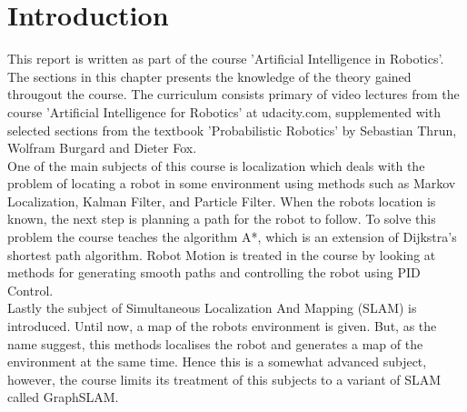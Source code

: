 
\section{Introduction} %
\label{sec:theory_introduction}

This report is written as part of the course 'Artificial Intelligence in Robotics'. The sections in this chapter presents the knowledge of the theory gained througout the course. The curriculum consists primary of video lectures from the course 'Artificial Intelligence for Robotics' at udacity.com, supplemented with selected sections from the textbook 'Probabilistic Robotics' by Sebastian Thrun, Wolfram Burgard and Dieter Fox.\\

One of the main subjects of this course is localization which deals with the problem of locating a robot in some environment using methods such as Markov Localization, Kalman Filter, and Particle Filter. When the robots location is known, the next step is planning a path for the robot to follow. To solve this problem the course teaches the algorithm A*, which is an extension of Dijkstra's shortest path algorithm. Robot Motion is treated in the course by looking at methods for generating smooth paths and controlling the robot using PID Control.\\

Lastly the subject of Simultaneous Localization And Mapping (SLAM) is introduced. Until now, a map of the robots environment is given. But, as the name suggest, this methods localises the robot and generates a map of the environment at the same time. Hence this is a somewhat advanced subject, however, the course limits its treatment of this subjects to a variant of SLAM called GraphSLAM.

